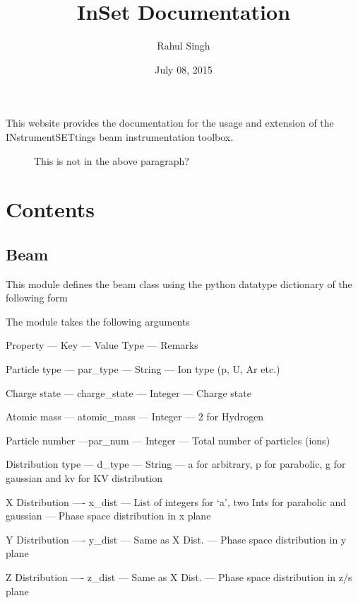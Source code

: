 \documentclass[letterpaper,10pt,english]{sphinxmanual}
\title{InSet Documentation}
\date{July 08, 2015}
\author{Rahul Singh}
\begin{document}
\maketitle
\tableofcontents
{}\label{index::doc}

\begin{description}
\item[{This website provides the documentation for the usage and extension of the INstrumentSETtings beam instrumentation toolbox.}] \leavevmode
This is not in the above paragraph?

\end{description}


\chapter{Contents}
\label{index:index-label}\label{index:welcome-to-inset}\label{index:contents}

\section{Beam}
\label{beam:module-beam}\label{beam::doc}\label{beam:beam}\label{beam:beam-label}
This module defines the beam class using the python datatype dictionary of the following form

The module takes the following arguments

Property --- Key --- Value Type --- Remarks

Particle type --- par\_type --- String --- Ion type (p, U, Ar etc.)

Charge state --- charge\_state --- Integer --- Charge state

Atomic mass --- atomic\_mass ---  Integer --- 2 for Hydrogen

Particle number ---par\_num --- Integer --- Total number of particles (ions)

Distribution type --- d\_type --- String --- a for arbitrary, p for parabolic, g for gaussian and kv for KV distribution

X Distribution ---- x\_dist --- List of integers for `a', two Ints for parabolic and gaussian --- Phase space distribution in x plane

Y Distribution ---- y\_dist --- Same as X Dist. --- Phase space distribution in y plane

Z Distribution ---- z\_dist --- Same as X Dist. --- Phase space distribution in z/s plane
\end{document}
